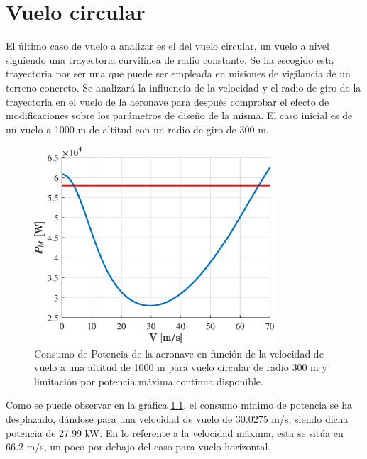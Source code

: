 \chapter{Vuelo circular}

El último caso de vuelo a analizar es el del vuelo circular, un vuelo a nivel siguiendo una trayectoria curvilínea de radio constante. Se ha escogido esta trayectoria por ser una que puede ser empleada en misiones de vigilancia de un terreno concreto. 
Se analizará la influencia de la velocidad y el radio de giro de la trayectoria en el vuelo de la aeronave para después comprobar el efecto de modificaciones sobre los parámetros de diseño de la misma. El caso inicial es de un vuelo a 1000 m de altitud con un radio de giro de 300 m. 

\begin{figure}
	\centering
	\includegraphics[width=90mm]{graficos/PMVC}
	\caption{Consumo de Potencia de la aeronave en función de la velocidad de vuelo a una altitud de 1000 m para vuelo circular de radio 300 m y limitación por potencia máxima continua disponible.}
	\label{PMVC}
\end{figure}

Como se puede observar en la gráfica \ref{PMVC}, el consumo mínimo de potencia se ha desplazado, dándose para una velocidad de vuelo de 30.0275 m/s, siendo dicha potencia de 27.99 kW. En lo referente a la velocidad máxima, esta se sitúa en 66.2 m/s, un poco por debajo del caso para vuelo horizontal.

